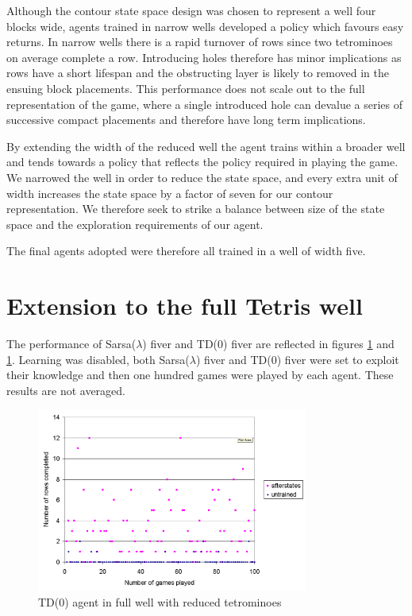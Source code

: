 \documentclass{rucsthesis}
\begin{document}
Although the contour state space design was chosen to represent a well four blocks wide, agents trained in narrow wells developed a policy which favours easy returns. In narrow wells there is a rapid turnover of rows since two tetrominoes on average complete a row. Introducing holes therefore has minor implications as rows have a short lifespan and the obstructing layer is likely to removed in the ensuing block placements. This performance does not scale out to the full representation of the game, where a single introduced hole can devalue a series of successive compact placements and therefore have long term implications.

By extending the width of the reduced well the agent trains within a broader well and tends towards a policy that reflects the policy required in playing the game. We narrowed the well in order to reduce the state space, and every extra unit of width increases the state space by a factor of seven for our contour representation. We therefore seek to strike a balance between size of the state space and the exploration requirements of our agent.

The final agents adopted were therefore all trained in a well of width five.

\section{Extension to the full Tetris well}

The performance of Sarsa($\lambda$) fiver and TD(0) fiver are reflected in figures \ref{fig:afterstatesredtetfullwell} and \ref{fig:afterstatesredtetfullwell}. Learning was disabled, both Sarsa($\lambda$) fiver and TD(0) fiver were set to exploit their knowledge and then one hundred games were played by each agent. These results are not averaged.

\begin{figure}[h]
\centering
\includegraphics[width=3.5in]{afterstatesredtetfullwell.png}
\caption{TD(0) agent in full well with reduced tetrominoes}
\label{fig:afterstatesredtetfullwell}
\end{figure}
\end{document}

